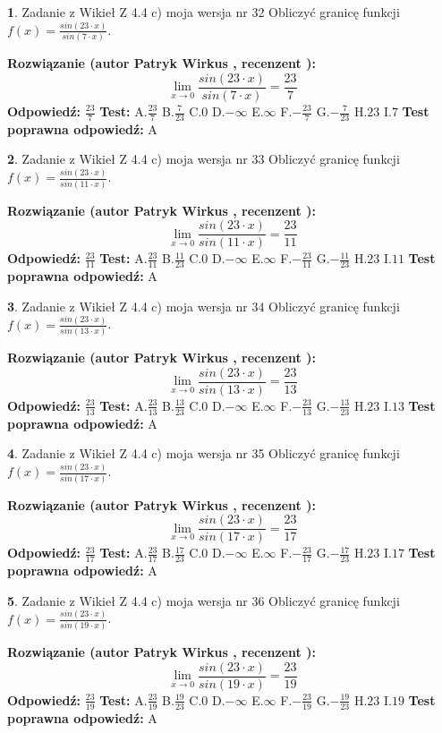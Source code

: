 \documentclass[12pt, a4paper]{article}
\theoremstyle{definition} %
\newtheorem{zad}{}
\newcommand{\zadStart}[1]{\begin{zad}#1\newline}
\newcommand{\zadStop}{\end{zad}}
\newcommand{\rozwStart}[2]{\noindent \textbf{Rozwiązanie (autor #1 , recenzent #2): }\newline}
\newcommand{\rozwStop}{\newline}
\newcommand{\odpStart}{\noindent \textbf{Odpowiedź:}\newline}
\newcommand{\odpStop}{\newline}
\newcommand{\testStart}{\noindent \textbf{Test:}\newline}
\newcommand{\testStop}{\newline}
\newcommand{\kluczStart}{\noindent \textbf{Test poprawna odpowiedź:}\newline}
\newcommand{\kluczStop}{\newline}
\begin{document}
\zadStart{Zadanie z Wikieł Z 4.4 c) moja wersja nr 32}
Obliczyć granicę funkcji $f(x)=\frac{sin(23\cdot x)}{sin(7\cdot x)}$.
\zadStop
\rozwStart{Patryk Wirkus}{}
$$\lim\limits_{x\to 0}\frac{sin(23\cdot x)}{sin(7\cdot x)}=
\frac{23}{7}$$
\rozwStop
\odpStart
$\frac{23}{7}$
\odpStop
\testStart
A.$\frac{23}{7}$
B.$\frac{7}{23}$
C.$0$
D.$-\infty$
E.$\infty$
F.$-\frac{23}{7}$
G.$-\frac{7}{23}$
H.$23$
I.$7$
\testStop
\kluczStart
A
\kluczStop



\zadStart{Zadanie z Wikieł Z 4.4 c) moja wersja nr 33}
Obliczyć granicę funkcji $f(x)=\frac{sin(23\cdot x)}{sin(11\cdot x)}$.
\zadStop
\rozwStart{Patryk Wirkus}{}
$$\lim\limits_{x\to 0}\frac{sin(23\cdot x)}{sin(11\cdot x)}=
\frac{23}{11}$$
\rozwStop
\odpStart
$\frac{23}{11}$
\odpStop
\testStart
A.$\frac{23}{11}$
B.$\frac{11}{23}$
C.$0$
D.$-\infty$
E.$\infty$
F.$-\frac{23}{11}$
G.$-\frac{11}{23}$
H.$23$
I.$11$
\testStop
\kluczStart
A
\kluczStop



\zadStart{Zadanie z Wikieł Z 4.4 c) moja wersja nr 34}
Obliczyć granicę funkcji $f(x)=\frac{sin(23\cdot x)}{sin(13\cdot x)}$.
\zadStop
\rozwStart{Patryk Wirkus}{}
$$\lim\limits_{x\to 0}\frac{sin(23\cdot x)}{sin(13\cdot x)}=
\frac{23}{13}$$
\rozwStop
\odpStart
$\frac{23}{13}$
\odpStop
\testStart
A.$\frac{23}{13}$
B.$\frac{13}{23}$
C.$0$
D.$-\infty$
E.$\infty$
F.$-\frac{23}{13}$
G.$-\frac{13}{23}$
H.$23$
I.$13$
\testStop
\kluczStart
A
\kluczStop



\zadStart{Zadanie z Wikieł Z 4.4 c) moja wersja nr 35}
Obliczyć granicę funkcji $f(x)=\frac{sin(23\cdot x)}{sin(17\cdot x)}$.
\zadStop
\rozwStart{Patryk Wirkus}{}
$$\lim\limits_{x\to 0}\frac{sin(23\cdot x)}{sin(17\cdot x)}=
\frac{23}{17}$$
\rozwStop
\odpStart
$\frac{23}{17}$
\odpStop
\testStart
A.$\frac{23}{17}$
B.$\frac{17}{23}$
C.$0$
D.$-\infty$
E.$\infty$
F.$-\frac{23}{17}$
G.$-\frac{17}{23}$
H.$23$
I.$17$
\testStop
\kluczStart
A
\kluczStop



\zadStart{Zadanie z Wikieł Z 4.4 c) moja wersja nr 36}
Obliczyć granicę funkcji $f(x)=\frac{sin(23\cdot x)}{sin(19\cdot x)}$.
\zadStop
\rozwStart{Patryk Wirkus}{}
$$\lim\limits_{x\to 0}\frac{sin(23\cdot x)}{sin(19\cdot x)}=
\frac{23}{19}$$
\rozwStop
\odpStart
$\frac{23}{19}$
\odpStop
\testStart
A.$\frac{23}{19}$
B.$\frac{19}{23}$
C.$0$
D.$-\infty$
E.$\infty$
F.$-\frac{23}{19}$
G.$-\frac{19}{23}$
H.$23$
I.$19$
\testStop
\kluczStart
A
\kluczStop
\end{document}
